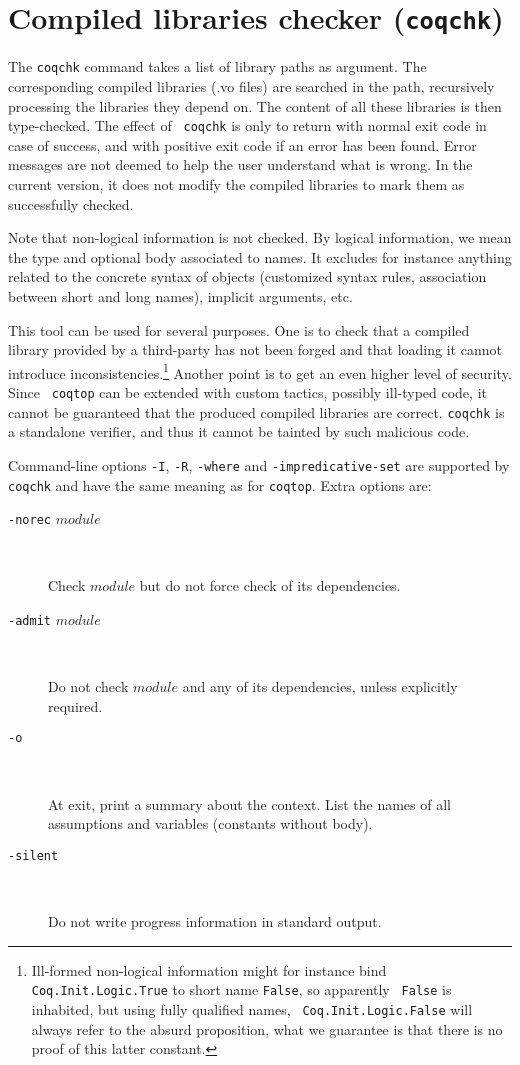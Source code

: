 \section{Compiled libraries checker ({\tt coqchk})}

The {\tt coqchk} command takes a list of library paths as argument.
The corresponding compiled libraries (.vo files) are searched in the
path, recursively processing the libraries they depend on. The content
of all these libraries is then type-checked. The effect of {\tt
  coqchk} is only to return with normal exit code in case of success,
and with positive exit code if an error has been found. Error messages
are not deemed to help the user understand what is wrong. In the
current version, it does not modify the compiled libraries to mark
them as successfully checked.

Note that non-logical information is not checked. By logical
information, we mean the type and optional body associated to names.
It excludes for instance anything related to the concrete syntax of
objects (customized syntax rules, association between short and long
names), implicit arguments, etc.

This tool can be used for several purposes. One is to check that a
compiled library provided by a third-party has not been forged and
that loading it cannot introduce inconsistencies.\footnote{Ill-formed
  non-logical information might for instance bind {\tt
    Coq.Init.Logic.True} to short name {\tt False}, so apparently {\tt
    False} is inhabited, but using fully qualified names, {\tt
    Coq.Init.Logic.False} will always refer to the absurd proposition,
  what we guarantee is that there is no proof of this latter
  constant.}
Another point is to get an even higher level of security. Since {\tt
  coqtop} can be extended with custom tactics, possibly ill-typed
code, it cannot be guaranteed that the produced compiled libraries are
correct. {\tt coqchk} is a standalone verifier, and thus it cannot be
tainted by such malicious code.

Command-line options {\tt -I}, {\tt -R}, {\tt -where} and
{\tt -impredicative-set} are supported by {\tt coqchk} and have the
same meaning as for {\tt coqtop}. Extra options are:
\begin{description}
\item[{\tt -norec} $module$]\ 

  Check $module$ but do not force check of its dependencies.
\item[{\tt -admit} $module$] \

  Do not check $module$ and any of its dependencies, unless
  explicitly required.
\item[{\tt -o}]\ 

  At exit, print a summary about the context. List the names of all
  assumptions and variables (constants without body).
\item[{\tt -silent}]\ 

  Do not write progress information in standard output.
\end{description}


